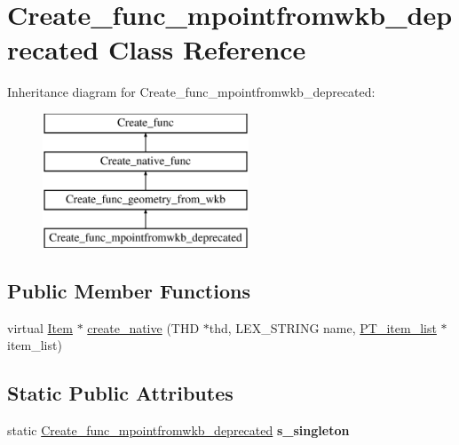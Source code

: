 \hypertarget{classCreate__func__mpointfromwkb__deprecated}{}\section{Create\+\_\+func\+\_\+mpointfromwkb\+\_\+deprecated Class Reference}
\label{classCreate__func__mpointfromwkb__deprecated}
Inheritance diagram for Create\+\_\+func\+\_\+mpointfromwkb\+\_\+deprecated\+:\begin{figure}[H]
\begin{center}
\leavevmode
\includegraphics[height=4.000000cm]{classCreate__func__mpointfromwkb__deprecated}
\end{center}
\end{figure}
\subsection*{Public Member Functions}
\begin{DoxyCompactItemize}
\item 
virtual \mbox{\hyperlink{classItem}{Item}} $\ast$ \mbox{\hyperlink{classCreate__func__mpointfromwkb__deprecated_ad724e9ffb73a5aaa630acc577bf341b7}{create\+\_\+native}} (T\+HD $\ast$thd, L\+E\+X\+\_\+\+S\+T\+R\+I\+NG name, \mbox{\hyperlink{classPT__item__list}{P\+T\+\_\+item\+\_\+list}} $\ast$item\+\_\+list)
\end{DoxyCompactItemize}
\subsection*{Static Public Attributes}
\begin{DoxyCompactItemize}
\item 
\mbox{\label{classCreate__func__mpointfromwkb__deprecated_a5613215ac3f220f0ddb2b2cc421273c2}} 
static \mbox{\hyperlink{classCreate__func__mpointfromwkb__deprecated}{Create\+\_\+func\+\_\+mpointfromwkb\+\_\+deprecated}} {\bfseries s\+\_\+singleton}
\end{DoxyCompactItemize}
